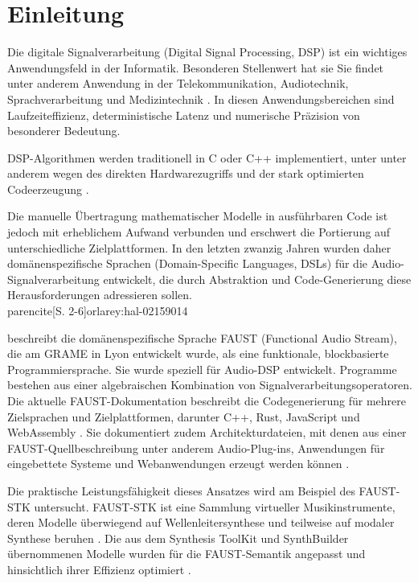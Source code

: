 \chapter{Einleitung}
\label{sec:introduction}
Die digitale Signalverarbeitung (Digital Signal Processing, DSP) ist ein wichtiges Anwendungsfeld in der Informatik. Besonderen Stellenwert hat sie
Sie findet unter anderem Anwendung in der Telekommunikation, Audiotechnik,
Sprachverarbeitung und Medizintechnik \parencite{ifeachor2002digital}. In diesen Anwendungsbereichen sind
Laufzeiteffizienz, deterministische Latenz und numerische Präzision von
besonderer Bedeutung.

DSP-Algorithmen werden traditionell in C oder C++ implementiert, unter
unter anderem wegen des direkten Hardwarezugriffs und der stark optimierten Codeerzeugung \parencite{levine1997dsp101}.

Die manuelle Übertragung mathematischer
Modelle in ausführbaren Code ist jedoch mit erheblichem Aufwand verbunden und erschwert die Portierung
auf unterschiedliche Zielplattformen. In den letzten zwanzig Jahren wurden daher domänenspezifische Sprachen (Domain-Specific Languages, DSLs) für die Audio-Signalverarbeitung entwickelt, die durch Abstraktion und Code-Generierung diese Herausforderungen adressieren sollen. \\parencite[S. 2-6]{orlarey:hal-02159014}

\textcite{orlarey:hal-02159014} beschreibt die domänenspezifische Sprache FAUST (Functional Audio Stream), die am GRAME in Lyon entwickelt wurde, als eine funktionale, blockbasierte Programmiersprache. Sie wurde speziell für Audio-DSP entwickelt. Programme bestehen aus einer algebraischen Kombination von Signalverarbeitungsoperatoren. Die aktuelle FAUST-Dokumentation beschreibt die Codegenerierung für mehrere
Zielsprachen und Zielplattformen, darunter C++, Rust, JavaScript und
WebAssembly \parencite{faust_manual}. Sie dokumentiert zudem
Architekturdateien, mit denen aus einer FAUST-Quellbeschreibung unter anderem
Audio-Plug-ins, Anwendungen für eingebettete Systeme und Webanwendungen
erzeugt werden können \parencite{faust_manual}.

Die praktische Leistungsfähigkeit dieses Ansatzes wird am Beispiel des
FAUST-STK untersucht. FAUST-STK ist eine Sammlung virtueller Musikinstrumente,
deren Modelle überwiegend auf Wellenleitersynthese und teilweise auf modaler
Synthese beruhen \parencite[S.~1]{michon2011fauststk}. Die aus dem Synthesis
ToolKit und SynthBuilder übernommenen Modelle wurden für die FAUST-Semantik
angepasst und hinsichtlich ihrer Effizienz optimiert
\parencite[S.~5--6]{michon2011fauststk}.

